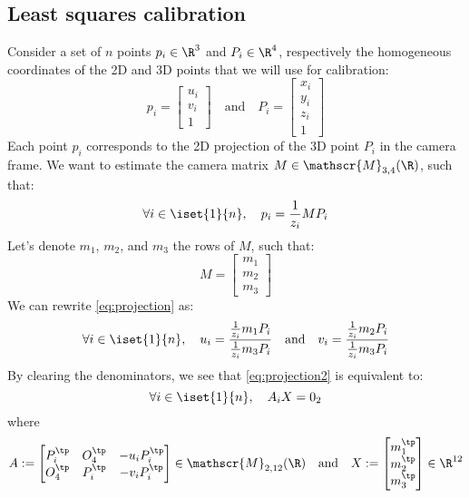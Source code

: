 \subsection{Least squares calibration}
\label{subsec:least-squares-calibration}
Consider a set of $n$ points $p_i\in\R^3$ and $P_i\in\R^4$, respectively the homogeneous coordinates of the 2D and 3D points that we will use for calibration:
\begin{equation*}
    p_i = \begin{bmatrix} u_i \\ v_i \\ 1 \end{bmatrix} \quad\text{and}\quad P_i = \begin{bmatrix} x_i \\ y_i \\ z_i \\ 1 \end{bmatrix}
\end{equation*}
Each point $p_i$ corresponds to the 2D projection of the 3D point $P_i$ in the camera frame. We want to estimate the camera matrix $M\in\mathscr{M}_{3,4}(\R)$, such that:
\begin{equation}
    \label{eq:projection}
    \forall i\in\iset{1}{n}, \quad p_i = \frac{1}{z_i}MP_i
\end{equation}
Let's denote $m_1$, $m_2$, and $m_3$ the rows of $M$, such that:
\begin{equation*}
    M = \begin{bmatrix} m_1 \\ m_2 \\ m_3 \end{bmatrix}
\end{equation*}
We can rewrite \eqref{eq:projection} as:
\begin{equation}
    \label{eq:projection2}
    \forall i\in\iset{1}{n}, \quad u_i = \frac{\frac{1}{z_i}m_1P_i}{\frac{1}{z_i}m_3P_i} \quad\text{and}\quad v_i = \frac{\frac{1}{z_i}m_2P_i}{\frac{1}{z_i}m_3P_i}
\end{equation}
By clearing the denominators, we see that \eqref{eq:projection2} is equivalent to:
\begin{equation}
    \label{eq:projection3}
    \forall i\in\iset{1}{n}, \quad A_iX = 0_2
\end{equation}
where
\begin{equation*}
    A := \begin{bmatrix}
        P_i^\tp & O_4^\tp & -u_iP_i^\tp \\
        O_4^\tp & P_i^\tp & -v_iP_i^\tp
    \end{bmatrix}\in\mathscr{M}_{2,12}(\R)
    \quad\text{and}\quad
    X := \begin{bmatrix} m_1^\tp \\ m_2^\tp \\ m_3^\tp \end{bmatrix}\in\R^{12}
\end{equation*}

